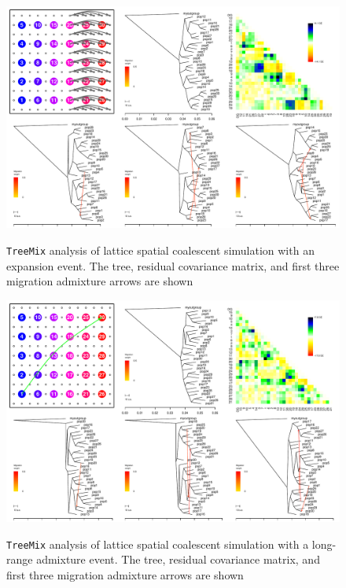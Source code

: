 \documentclass[10pt,letterpaper]{article}
\begin{document}
\begin{figure}
	\centering
		{\includegraphics[width=\textwidth]{../figs/sims/Treemix_comparison/ms_dataset_expansiontreemix_fig_sequential.pdf}}
	\caption{\texttt{TreeMix} analysis of lattice spatial coalescent simulation with an expansion event.  The tree, residual covariance matrix, and first three migration admixture arrows are shown}\label{sfig:treemix_expansion}
\end{figure}

\begin{figure}
	\centering
		{\includegraphics[width=\textwidth]{../figs/sims/Treemix_comparison/ms_dataset_corner_admixturetreemix_fig_sequential.pdf}}
	\caption{\texttt{TreeMix} analysis of lattice spatial coalescent simulation with a long-range admixture event.  The tree, residual covariance matrix, and first three migration admixture arrows are shown}\label{sfig:treemix_corneradmixture}
\end{figure}
\end{document}
